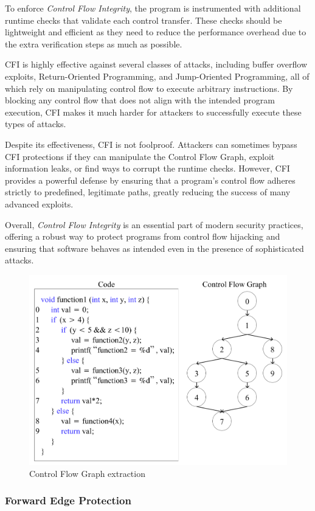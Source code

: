 To enforce \textit{Control Flow Integrity}, the program is instrumented with additional
runtime checks that validate each control transfer. These checks should be
lightweight and efficient as they need to reduce the performance overhead due to
the extra verification steps as much as possible.

CFI is highly effective against several classes of attacks, including buffer overflow
exploits, Return-Oriented Programming, and Jump-Oriented Programming, all of
which rely on manipulating control flow to execute arbitrary instructions. By blocking
any control flow that does not align with the intended program execution, CFI
makes it much harder for attackers to successfully execute these types of
attacks.

Despite its effectiveness, CFI is not foolproof. Attackers can sometimes bypass
CFI protections if they can manipulate the Control Flow Graph, exploit information
leaks, or find ways to corrupt the runtime checks. However, CFI provides a
powerful defense by ensuring that a program's control flow adheres strictly to
predefined, legitimate paths, greatly reducing the success of many advanced
exploits.

Overall, \textit{Control Flow Integrity} is an essential part of modern security
practices, offering a robust way to protect programs from control flow hijacking
and ensuring that software behaves as intended even in the presence of sophisticated
attacks.

\begin{figure}
  \centering
  \includegraphics[width=.6\linewidth]{images/cfg.png}
  \caption{Control Flow Graph extraction}
  \label{fig:cfg}
\end{figure}

\subsubsection{Forward Edge Protection}
\label{subsubsec:background_forward}

